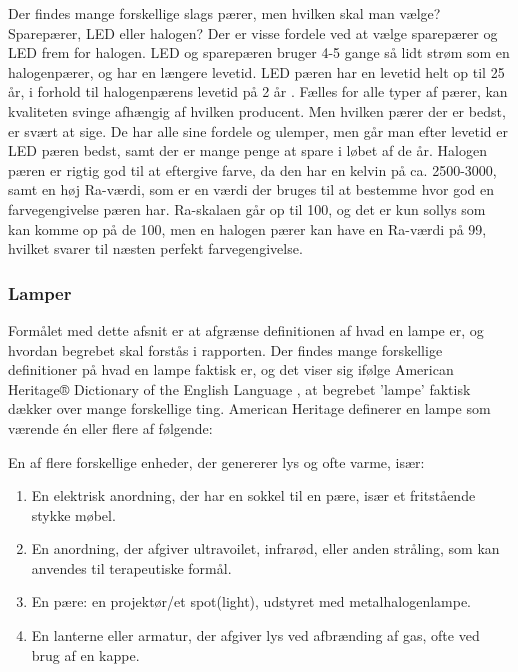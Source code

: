 Der findes mange forskellige slags pærer, men hvilken skal man vælge? Sparepærer, LED eller halogen?
Der er visse fordele ved at vælge sparepærer og LED frem for halogen. LED og sparepæren bruger 4-5 gange så lidt strøm som en halogenpærer, og har en længere levetid. LED pæren \cite{LED} har en levetid helt op til 25 år, i forhold til halogenpærens levetid på 2 år \cite{vaelg_paere}.
Fælles for alle typer af pærer, kan kvaliteten svinge afhængig af hvilken producent. Men hvilken pærer der er bedst, er svært at sige. De har alle sine fordele og ulemper, men går man efter levetid er LED pæren bedst, samt der er mange penge at spare i løbet af de år. Halogen pæren er rigtig god til at eftergive farve, da den har en kelvin på ca. 2500-3000, samt en høj Ra-værdi, som er en værdi der bruges til at bestemme hvor god en farvegengivelse pæren har. 
Ra-skalaen går op til 100, og det er kun sollys som kan komme op på de 100, men en halogen pærer \cite{halogen_paere} kan have en Ra-værdi på 99, hvilket svarer til næsten perfekt farvegengivelse. 

\subsubsection{Lamper}
Formålet med dette afsnit er at afgrænse definitionen af hvad en lampe er, og hvordan begrebet skal forstås i rapporten.
Der findes mange forskellige definitioner på hvad en lampe faktisk er, og det viser sig ifølge American Heritage® Dictionary of the English Language \cite{american_heritage}, at begrebet ’lampe’ faktisk dækker over mange forskellige ting. American Heritage definerer en lampe som værende én eller flere af følgende:

En af flere forskellige enheder, der genererer lys og ofte varme, især:
\begin{enumerate}
    \item En elektrisk anordning, der har en sokkel til en pære, især et fritstående stykke møbel.
    \item En anordning, der afgiver ultravoilet, infrarød, eller anden stråling, som kan anvendes til terapeutiske formål.
    \item En pære: en projektør/et spot(light), udstyret med metalhalogenlampe.
    \item En lanterne eller armatur, der afgiver lys ved afbrænding af gas, ofte ved brug af en kappe.
\end{enumerate}

